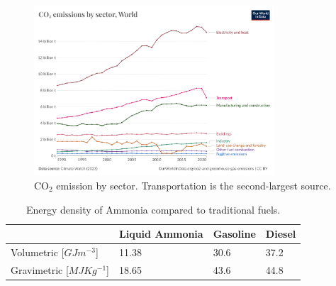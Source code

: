 \begin{figure}[H]
    \centering
    \includegraphics[width=0.8\textwidth]{img/co-emissions-by-sector.png}
    \caption{$\mathrm{CO_2}$ emission by sector\cite{owid-emissions-by-sector}. Transportation is the second-largest source.}
    \label{fig:co2_emission_by_sector}
\end{figure}

\begin{table}[H]
    \centering
    \begin{tabular}{|l|l|l|l|}
        \hline
        ~                          & \textbf{Liquid Ammonia} & \textbf{Gasoline} & \textbf{Diesel} \\
        \hline
        Volumetric [$GJ m^{-3}$]   & 11.38                   & 30.6              & 37.2            \\
        Gravimetric [$MJ Kg^{-1}$] & 18.65                   & 43.6              & 44.8            \\
        \hline
    \end{tabular}
    \caption{Energy density of Ammonia compared to traditional fuels\cite{energy-density}.}
    \label{tab:energy_density}
\end{table}
